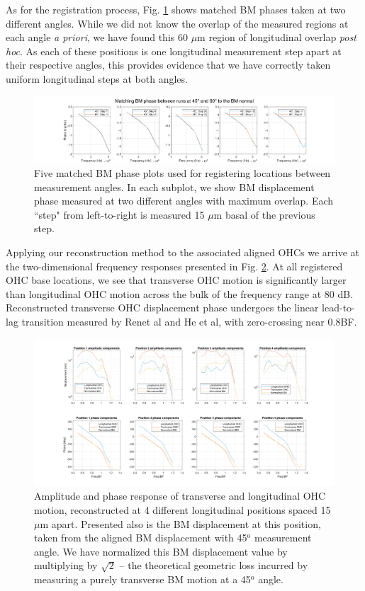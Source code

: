 \documentclass[aip,cp,amsmath,amssymb,reprint]{revtex4-2}
\begin{document}
\par{As for the registration process, Fig. \ref{fig:matching} shows matched BM phases taken at two different angles. While we did not know the overlap of the measured regions at each angle \textit{a priori}, we have found this 60 $\mu$m region of longitudinal overlap \textit{post hoc}. As each of these positions is one longitudinal measurement step apart  at their respective angles, this provides evidence that we have correctly taken uniform longitudinal steps at both angles.}
\begin{figure}[h]
	\includegraphics[width=\textwidth]{Figures/matching_MOH.png}
	\caption{Five matched BM phase plots used for registering locations between measurement angles. In each subplot, we show BM displacement phase measured at two different angles with maximum overlap. Each ``step" from left-to-right is measured 15 $\mu$m basal of the previous step.}
	\label{fig:matching}
\end{figure}
\par{Applying our reconstruction method to the associated aligned OHCs we arrive at the two-dimensional frequency responses presented in Fig. \ref{fig:ohcresp}. At all registered OHC base locations, we see that transverse OHC motion is significantly larger than longitudinal OHC motion across the bulk of the frequency range at 80 dB. Reconstructed transverse OHC displacement phase undergoes the linear lead-to-lag transition measured by Renet al and He et al, with zero-crossing near 0.8BF\cite{he2018,ren2016}.}
\begin{figure}[h]
	\includegraphics[width=\textwidth]{Figures/ampphase_MOH.png}
	\caption{Amplitude and phase response of transverse and longitudinal OHC motion, reconstructed at 4 different longitudinal positions spaced 15 $\mu$m apart. Presented also is the BM displacement at this position, taken from the aligned BM displacement with 45$^\text{o}$ measurement angle. We have normalized this BM displacement value by multiplying by $\sqrt{2}$ -- the theoretical geometric loss incurred by measuring a purely transverse BM motion at a 45$^\text{o}$ angle.}
	\label{fig:ohcresp}
\end{figure}
\end{document}
